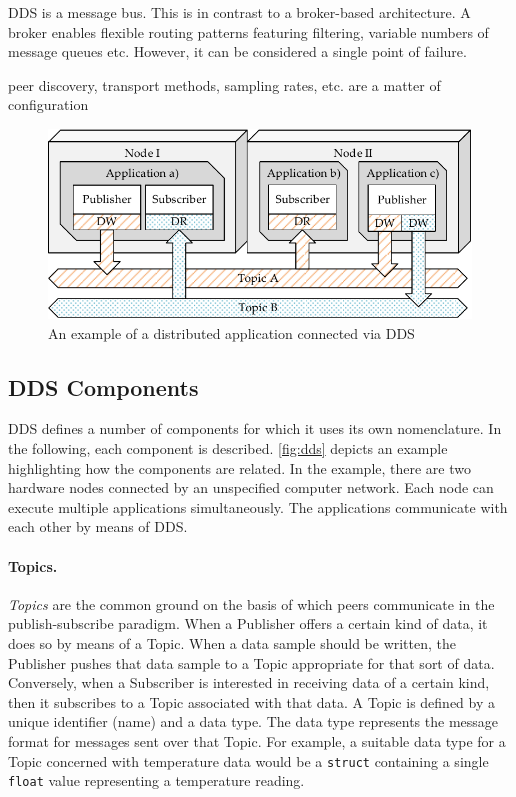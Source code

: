 DDS is a message bus. This is in contrast to a broker-based architecture. A broker enables flexible routing patterns featuring filtering, variable numbers of message queues etc. However, it can be considered a single point of failure.


peer discovery, transport methods, sampling rates, etc. are a matter of configuration


\begin{figure}[htpb]
  \centering
  \includegraphics[width=\textwidth]{figures/dds.pdf}
  \caption[An example of a distributed application connected via DDS]{An example of a distributed application connected via DDS}\label{fig:dds}
\end{figure}

\subsection{DDS Components}

DDS defines a number of components for which it uses its own nomenclature. In the following, each component is described. \autoref{fig:dds} depicts an example highlighting how the components are related. In the example, there are two hardware nodes connected by an unspecified computer network. Each node can execute multiple applications simultaneously. The applications communicate with each other by means of DDS. 

\paragraph{Topics.}
\emph{Topics} are the common ground on the basis of which peers communicate in the publish-subscribe paradigm. When a Publisher offers a certain kind of data, it does so by means of a Topic. When a data sample should be written, the Publisher pushes that data sample to a Topic appropriate for that sort of data. Conversely, when a Subscriber is interested in receiving data of a certain kind, then it subscribes to a Topic associated with that data. A Topic is defined by a unique identifier (name) and a data type. The data type represents the message format for messages sent over that Topic. For example, a suitable data type for a Topic concerned with temperature data would be a \texttt{struct} containing a single \texttt{float} value representing a temperature reading.

